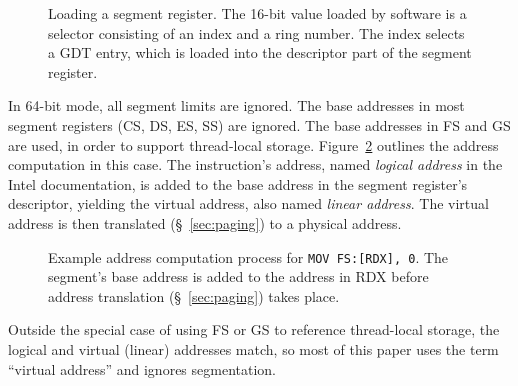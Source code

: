 \begin{figure}[hbt]
  \caption{
    Loading a segment register. The 16-bit value loaded by software is a
    selector consisting of an index and a ring number. The index selects a GDT
    entry, which is loaded into the descriptor part of the segment register.
  }
  \label{fig:cpu_segment}
\end{figure}

In 64-bit mode, all segment limits are ignored. The base addresses in most
segment registers (CS, DS, ES, SS) are ignored. The base addresses in FS and GS
are used, in order to support thread-local storage.
Figure~\ref{fig:cpu_segmentation} outlines the address computation in this
case. The instruction's address, named \textit{logical address} in the Intel
documentation, is added to the base address in the segment register's
descriptor, yielding the virtual address, also named \textit{linear address}.
The virtual address is then translated (\S~\ref{sec:paging}) to a physical
address.

\begin{figure}[hbt]
  \caption{
    Example address computation process for \texttt{MOV FS:[RDX], 0}.  The
    segment's base address is added to the address in RDX before address
    translation (\S~\ref{sec:paging}) takes place.
  }
  \label{fig:cpu_segmentation}
\end{figure}

Outside the special case of using FS or GS to reference thread-local storage,
the logical and virtual (linear) addresses match, so most of this paper uses
the term ``virtual address'' and ignores segmentation.

